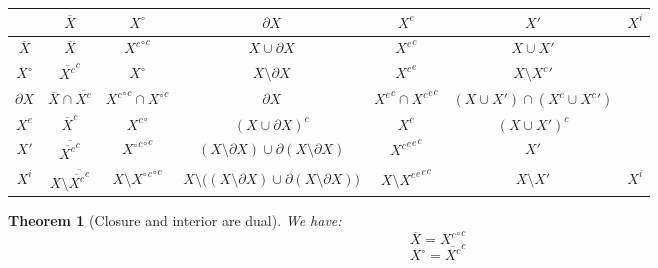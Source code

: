 \documentclass{article}
\newtheorem{theorem}{Theorem}[section]
\theoremstyle{definition}
\theoremstyle{remark}
\theoremstyle{example}
\theoremstyle{notation}
\newcommand{\inter}[1]{{{#1}^\circ}}
\newcommand{\adher}[1]{{\overline{#1}}}
\newcommand{\bound}[1]{{\partial #1}}
\newcommand{\exter}[1]{{{#1}^e}}
\newcommand{\limit}[1]{{{#1}'}}
\newcommand{\isol}[1]{{{#1}^i}}
\begin{document}
\begin{center}
		\begin{tabular}{|c|c|c|c|c|c|c|}
				\hline
						    & $\adher{X}$                               & $\inter{X}$                         & $\bound{X}$                                                                  & $\exter{X}$                         & $\limit{X}$                                      & $\isol{X}$\\
				\hline
				$\adher{X}$ & $\adher{X}$                               & $\inter{X^c}^c$                     & $X \cup \bound{X}$                                                           & $\exter{X}^c$                       & $X \cup \limit{X}$                               &           \\
				$\inter{X}$ & $\adher{X^c}^c$                           & $\inter{X}$                         & $X \setminus \bound{X}$                                                      & $\exter{X^c}$                       & $X \setminus \limit{X^c}$                        &           \\
				$\bound{X}$ & $\adher{X} \cap \adher{X^c}$              & $\inter{X^c}^c \cap \inter{X}^c$    & $\bound{X}$                                                                  & $\exter{X}^c \cap \exter{X^c}^c$    & $(X \cup \limit{X}) \cap (X^c \cup \limit{X^c})$ &           \\
				$\exter{X}$ & $\adher{X}^c$                             & $\inter{X^c}$                       & $(X \cup \bound{X})^c$                                                       & $\exter{X}$                         & $(X \cup \limit{X})^c$                           &           \\
				$\limit{X}$ & $\adher{\adher{X^c}^c}$                   & $\inter{\inter{X}^c}^c$             & $(X \setminus \bound{X}) \cup \bound{(X \setminus \bound{X})}$               & $\exter{\exter{X^c}}^c$             & $\limit{X}$                                      &           \\
				$\isol{X}$  & $X \setminus \overline{\overline{X^c}^c}$ & $X \setminus \inter{\inter{X}^c}^c$ & $X \setminus ((X \setminus \bound{X}) \cup \bound{(X \setminus \bound{X}))}$ & $X \setminus \exter{\exter{X^c}}^c$ & $X \setminus \limit{X}$                          & $\isol{X}$\\
				\hline
		\end{tabular}
\end{center}

\begin{theorem}[Closure and interior are dual]
		We have:
				$$\adher{X} = \inter{X^c}^c$$
				$$\inter{X} = \adher{X^c}^c$$	
\end{theorem}
\end{document}
